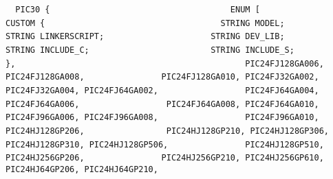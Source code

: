 {{{{%
\lstinline!	 PIC30 {                                ! \newline
\lstinline!	   ENUM [                               ! \newline
\lstinline!	     CUSTOM {                           ! \newline
\lstinline!	       STRING MODEL;                    ! \newline
\lstinline!	       STRING LINKERSCRIPT;             ! \newline
\lstinline!	       STRING DEV_LIB;                  ! \newline
\lstinline!	       STRING INCLUDE_C;                ! \newline
\lstinline!	       STRING INCLUDE_S;                ! \newline
\lstinline!	     },                                 ! \newline
\lstinline!             PIC24FJ128GA006, PIC24FJ128GA008,  ! \newline
\lstinline!             PIC24FJ128GA010, PIC24FJ32GA002,   ! \newline
\lstinline!             PIC24FJ32GA004, PIC24FJ64GA002,    ! \newline
\lstinline!             PIC24FJ64GA004, PIC24FJ64GA006,    ! \newline
\lstinline!             PIC24FJ64GA008, PIC24FJ64GA010,    ! \newline
\lstinline!             PIC24FJ96GA006, PIC24FJ96GA008,    ! \newline
\lstinline!             PIC24FJ96GA010, PIC24HJ128GP206,   ! \newline
\lstinline!             PIC24HJ128GP210, PIC24HJ128GP306,  ! \newline
\lstinline!             PIC24HJ128GP310, PIC24HJ128GP506,  ! \newline
\lstinline!             PIC24HJ128GP510, PIC24HJ256GP206,  ! \newline
\lstinline!             PIC24HJ256GP210, PIC24HJ256GP610,  ! \newline
\lstinline!             PIC24HJ64GP206, PIC24HJ64GP210,    ! \newline
}}}}
